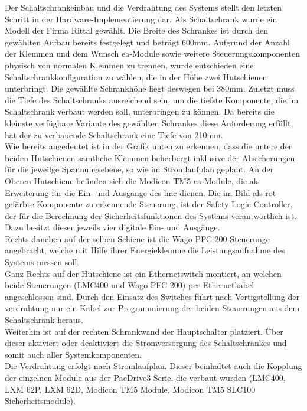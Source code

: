 \documentclass[../../../Bachelorarbeit.tex]{subfiles}
\begin{document}
Der Schaltschrankeinbau und die Verdrahtung des Systems stellt den letzten Schritt in der Hardware-Implementierung dar. Als Schaltschrank wurde ein Modell der Firma Rittal gewählt. Die Breite des Schrankes ist durch den gewählten Aufbau bereits festgelegt und beträgt 600\si{\mm}. Aufgrund der Anzahl der Klemmen und dem Wunsch \acs{ea}-Module sowie weitere Steuerungskomponenten physisch von normalen Klemmen zu trennen, wurde entschieden eine Schaltschrankkonfiguration zu wählen, die in der Höhe zwei Hutschienen unterbringt. Die gewählte Schrankhöhe liegt deswegen bei 380\si{\mm}. Zuletzt muss die Tiefe des Schaltschranks ausreichend sein, um die tiefste Komponente, die im Schaltschrank verbaut werden soll, unterbringen zu können. Da bereits die kleinste verfügbare Variante des gewählten Schrankes diese Anforderung erfüllt, hat der zu verbauende Schaltschrank eine Tiefe von 210\si{\mm}.\\
Wie bereits angedeutet ist in der Grafik unten zu erkennen, dass die untere der beiden Hutschienen sämtliche Klemmen beherbergt inklusive der Absicherungen für die jeweilge Spannungsebene, so wie im Stromlaufplan geplant. An der Oberen Hutschiene befinden sich die Modicon TM5 \acs{ea}-Module, die als Erweiterung für die Ein- und Ausgänge des \acs{lmc} dienen. Die im Bild als rot gefärbte Komponente zu erkennende Steuerung, ist der Safety Logic Controller, der für die Berechnung der Sicherheitsfunktionen des Systems verantwortlich ist. Dazu besitzt dieser jeweils vier digitale Ein- und Ausgänge.\\
Rechts daneben auf der selben Schiene ist die Wago PFC 200 Steuerunge angebracht, welche mit Hilfe ihrer Energieklemme die Leistungsaufnahme des Systems messen soll.\\
Ganz Rechts auf der Hutschiene ist ein Ethernetswitch montiert, an welchen beide Steuerungen (LMC400 und Wago PFC 200) per Ethernetkabel angeschlossen sind. Durch den Einsatz des Switches führt nach Vertigstellung der verdrahtung nur ein Kabel zur Programmierung der beiden Steuerungen aus dem Schaltschrank heraus.\\
Weiterhin ist auf der rechten Schrankwand der Hauptschalter platziert. Über dieser aktiviert oder deaktiviert die Stromversorgung des Schaltschrankes und somit auch aller Systemkomponenten.\\
Die Verdrahtung erfolgt nach Stromlaufplan. Dieser beinhaltet auch die Kopplung der einzelnen Module aus der PacDrive3 Serie, die verbaut wurden (LMC400, LXM 62P, LXM 62D, Modicon TM5 Module, Modicon TM5 SLC100 Sicherheitsmodule). 
\end{document}
